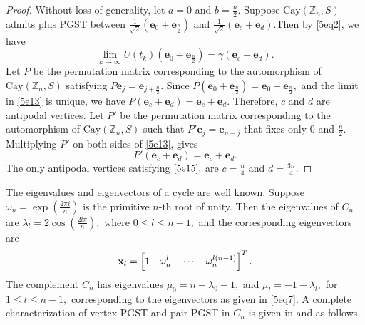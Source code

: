 \documentclass[12pt,a4paper]{article}
\newtheorem{rem}{Remark}
\def \e {{\bf e}}
\def \x {{\bf x}}
\def \e {{\mathbf e}}
\newcommand{\ob}[1]{\left(#1\right)}
\newcommand{\tb}[1]{\left[#1\right]}
\begin{document}
\begin{proof}
    Without loss of generality, let $a=0$ and $b=\frac{n}{2}.$ Suppose $\text{Cay}(\mathbb{Z}_n, S)$ admits plus PGST between $\frac{1}{\sqrt{2}}\ob{\e_0+\e_{\frac{n}{2}}}$ and $\frac{1}{\sqrt{2}}\ob{\e_c+\e_d}.$Then by \eqref{5eq2}, we have 
\begin{equation}\label{5e13}
       \lim_{k \to \infty}U\ob{t_k}\ob{\e_0+\e_{\frac{n}{2}}}=\gamma\ob{\e_c+\e_d}.
   \end{equation}
    Let $P$ be the permutation matrix corresponding to the automorphism of $\text{Cay}(\mathbb{Z}_n, S)$ satisfying $P\e_j=\e_{j+\frac{n}{2}}.$ Since $P(\e_0+\e_{\frac{n}{2}})=\e_0+\e_{\frac{n}{2}},$ and the limit in \eqref{5e13} is unique, we have
$P(\e_c+\e_d)=\e_c+\e_d.$
Therefore, $c$ and $d$ are antipodal vertices. Let $P'$ be the permutation matrix corresponding to the automorphism of $\text{Cay}(\mathbb{Z}_n, S)$ such that $P'\e_j=\e_{n-j} $ that fixes only $0$ and $\frac{n}{2}.$ Multiplying $P'$ on both sides of \eqref{5e13}, gives 
\begin{equation}\label{5e15}
P'(\e_c+\e_d)=\e_c+\e_d.
\end{equation}
The only antipodal vertices satisfying $\eqref{5e15},$ are $c=\frac{n}{4}$ and $d=\frac{3n}{4}.$ 
\end{proof}
 The eigenvalues and eigenvectors of a cycle are well known. Suppose $\omega_n=\exp {\ob{\frac{2\pi i}{n}}}$
is
the primitive $n$-th root of unity. Then the eigenvalues of $C_n$ \cite{bro} are
$\lambda_l=2\cos\ob{{\frac{2l\pi}{n}}},$ where $ 0\leq l\leq n-1,   
$
and the corresponding eigenvectors are \begin{equation}\label{5eq7}\x_l =\tb{1\quad \omega_n^l\quad\cdots\quad\omega_n^{l(n-1)}}^T.
\end{equation}
The complement $\overline{C_n}$ has eigenvalues $\mu_0=n-\lambda_0-1,$ and $\mu_l=-1-\lambda_l,$ for $1\leq l \leq n-1,$ corresponding to the eigenvectors as given in \eqref{5eq7}.
A complete characterization of vertex PGST and pair PGST in $C_n$ is given in \cite[Theorem 13]{pal4} and \cite[Theorem 10]{pal10} as follows.
\end{document}
